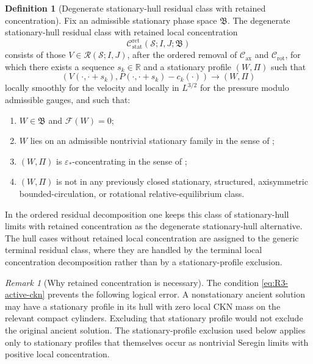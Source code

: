 \documentclass[11pt]{amsart}
\numberwithin{equation}{section}
\theoremstyle{plain}
\theoremstyle{definition}
\newtheorem{definition}[theorem]{Definition}
\theoremstyle{remark}
\newtheorem{remark}[theorem]{Remark}
\newcommand{\Cax}{\mathcal C_{\mathrm{ax}}}
\newcommand{\Crot}{\mathcal C_{\mathrm{rot}}}
\newcommand{\Cstat}{\mathcal C_{\mathrm{stat}}^{\mathrm{ret}}}
\begin{document}
\begin{definition}[Degenerate stationary-hull residual class with retained concentration]
\label{def:R3-active-class}
Fix an admissible stationary phase space \(\mathfrak B\).  The degenerate
stationary-hull residual class with retained local concentration
\[
   \Cstat(\mathcal S;I,J;\mathfrak B)
\]
consists of those \(V\in\mathcal R(\mathcal S;I,J)\), after the ordered
removal of \(\Cax\) and \(\Crot\), for which there exists a
sequence \(s_k\in\mathbb R\) and a stationary profile \((W,\Pi)\) such that
\begin{equation}\label{eq:R3-hull-convergence}
   (V(\cdot,\cdot+s_k),P(\cdot,\cdot+s_k)-c_k(\cdot))
   \longrightarrow (W,\Pi)
\end{equation}
locally smoothly for the velocity and locally in \(L^{3/2}\) for the pressure
modulo admissible gauges, and such that:
\begin{enumerate}[label=(\roman*)]
   \item \(W\in\mathfrak B\) and \(\mathcal F(W)=0\);
   \item \(W\) lies on an admissible nontrivial stationary family in the sense
      of ;
   \item \((W,\Pi)\) is \(\varepsilon_*\)-concentrating in the sense of
      ;
   \item \((W,\Pi)\) is not in any previously closed stationary, structured,
      axisymmetric bounded-circulation, or rotational relative-equilibrium
      class.
\end{enumerate}
In the ordered residual decomposition one keeps this class of stationary-hull
limits with retained concentration as the degenerate stationary-hull
alternative.  The hull cases
without retained local concentration
are assigned to the generic terminal residual class, where they are
handled by the terminal local concentration decomposition rather than by a
stationary-profile exclusion.
\end{definition}

\begin{remark}[Why retained concentration is necessary]
\label{rem:R3-active-necessary}
The condition \eqref{eq:R3-active-ckn} prevents the following logical error.  A
nonstationary ancient solution may have a stationary profile in its hull with
zero local CKN mass on the relevant compact cylinders.  Excluding that stationary
profile would not exclude the original ancient solution.  The
stationary-profile exclusion used below applies only to stationary profiles
that themselves occur as nontrivial Seregin limits with positive local
concentration.
\end{remark}
\end{document}
